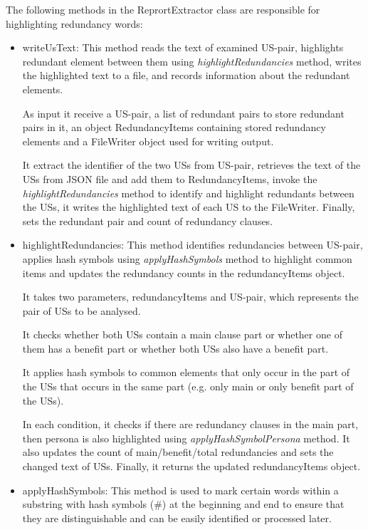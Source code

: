 The following methods in the ReprortExtractor class are responsible for highlighting redundancy words:
\begin{itemize}
	\item writeUsText: This method reads the text of examined US-pair, highlights redundant element between them using \textit{highlightRedundancies} method, writes the highlighted text to a file, and records information about the redundant elements. 
	
	As input it receive a US-pair, a list of redundant pairs to store redundant pairs in it, an object RedundancyItems containing stored redundancy elements and a FileWriter object used for writing output.
	
	It extract the identifier of the two USs from US-pair, retrieves the text of the USs from JSON file and add them to RedundancyItems, invoke the \textit{highlightRedundancies} method to identify and highlight redundants between the USs, it writes the highlighted text of each US to the FileWriter. Finally, sets the redundant pair and count of redundancy clauses.
	\item highlightRedundancies: This method identifies redundancies between US-pair, applies hash symbols using \textit{applyHashSymbols} method to highlight common items and updates the redundancy counts in the redundancyItems object. 
	
	It takes two parameters, redundancyItems and US-pair, which represents the pair of USs to be analysed. 
	
	It checks whether both USs contain a main clause part or whether one of them has a benefit part or whether both USs also have a benefit part.
	
	It applies hash symbols to common elements that only occur in the part of the USs that occurs in the same part (e.g. only main or only benefit part of the USs). 
	
	In each condition, it checks if there are redundancy clauses in the main part, then persona is also highlighted using \textit{applyHashSymbolPersona} method. It also updates the count of main/benefit/total redundancies and sets the changed text of USs. Finally, it returns the updated redundancyItems object.
	\item applyHashSymbols: This method is used to mark certain words within a substring with hash symbols (\#) at the beginning and end to ensure that they are distinguishable and can be easily identified or processed later. 
	

\end{itemize}
